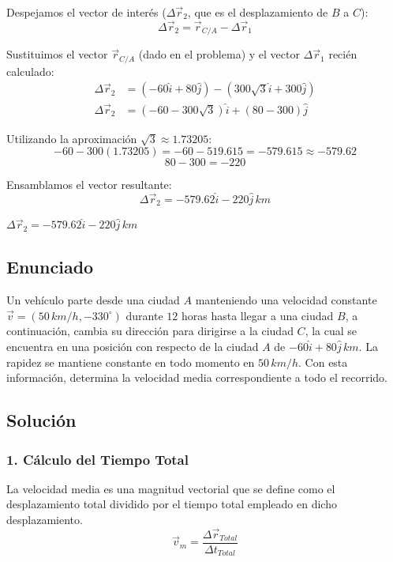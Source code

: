 \documentclass[12pt, a4paper]{article}
\begin{document}
Despejamos el vector de interés ($\Delta\vec{r}_2$, que es el desplazamiento de $B$ a $C$):
$$ \Delta\vec{r}_2 = \vec{r}_{C/A} - \Delta\vec{r}_1 $$

Sustituimos el vector $\vec{r}_{C/A}$ (dado en el problema) y el vector $\Delta\vec{r}_1$ recién calculado:
\begin{align*}
    \Delta\vec{r}_2 &= (-60\hat{i} + 80\hat{j}) - (300\sqrt{3}\hat{i} + 300\hat{j}) \\
    \Delta\vec{r}_2 &= (-60 - 300\sqrt{3})\hat{i} + (80 - 300)\hat{j}
\end{align*}

Utilizando la aproximación $\sqrt{3} \approx 1.73205$:
$$ -60 - 300(1.73205) = -60 - 519.615 = -579.615 \approx -579.62 $$
$$ 80 - 300 = -220 $$

Ensamblamos el vector resultante:
$$ \Delta\vec{r}_2 = -579.62\hat{i} - 220\hat{j} \, \si{km} $$

\begin{tcolorbox}[colback=green!5!white, colframe=green!50!black, title=Respuesta Final]
\centering \Large $\Delta\vec{r}_2 = -579.62\hat{i} - 220\hat{j} \, \si{km}$
\end{tcolorbox}

\newpage

\subsection*{Enunciado}
Un vehículo parte desde una ciudad $A$ manteniendo una velocidad constante $\vec{v} = (50 \, \si{km/h}, -330^\circ)$ durante $12$ horas hasta llegar a una ciudad $B$, a continuación, cambia su dirección para dirigirse a la ciudad $C$, la cual se encuentra en una posición con respecto de la ciudad $A$ de $-60\hat{i} + 80\hat{j} \, \si{km}$. La rapidez se mantiene constante en todo momento en $50 \, \si{km/h}$. Con esta información, determina la velocidad media correspondiente a todo el recorrido.

\subsection*{Solución}

\subsubsection*{1. Cálculo del Tiempo Total}
La velocidad media es una magnitud vectorial que se define como el desplazamiento total dividido por el tiempo total empleado en dicho desplazamiento.
$$ \vec{v}_m = \frac{\Delta\vec{r}_{Total}}{\Delta t_{Total}} $$
\end{document}

